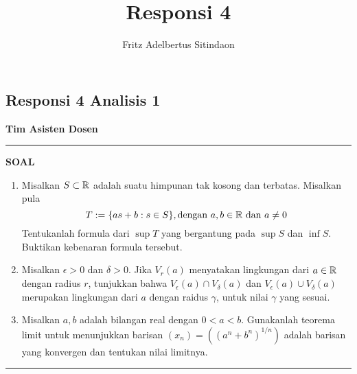 \documentclass{article}
\title{Responsi 4}
\author{Fritz Adelbertus Sitindaon}
\date{}
\begin{document}
\begin{flushright}
    \section*{Responsi 4 Analisis 1}
    \textbf{Tim Asisten Dosen}
\end{flushright}


\vspace{0.5cm}\hrule height 2pt\vspace{0.5cm}



\begin{center}
\textbf{\large{SOAL}}
\end{center}
\begin{enumerate}[leftmargin=*, label={\arabic*}.]
\item Misalkan $S \subset \mathbb{R}$ adalah suatu himpunan tak kosong dan terbatas. Misalkan pula
\[
    T := \{as+b: s\in S\}, \text{dengan } a,b\in \mathbb{R} \text{ dan } a\neq 0
\]
Tentukanlah formula dari $\sup T$ yang bergantung pada $\sup S$ dan $\inf S$. Buktikan kebenaran formula tersebut.

\item Misalkan $\epsilon > 0$ dan $\delta > 0$. Jika $V_r(a)$ menyatakan lingkungan 
dari $a \in \mathbb{R}$ dengan radius $r$, tunjukkan bahwa $V_\epsilon(a)\cap V_\delta(a)$ 
dan $V_\epsilon(a) \cup V_\delta(a)$ merupakan lingkungan dari $a$ dengan raidus 
$\gamma$, untuk nilai $\gamma$ yang sesuai.

\item Misalkan $a,b$ adalah bilangan real dengan $0 < a < b$. Gunakanlah teorema limit 
untuk menunjukkan barisan $(x_n)=((a^n+b^n)^{1/n})$ adalah barisan yang konvergen 
dan tentukan nilai limitnya.
\end{enumerate}


\vspace{0.2cm}\hrule height 1pt
\end{document}
